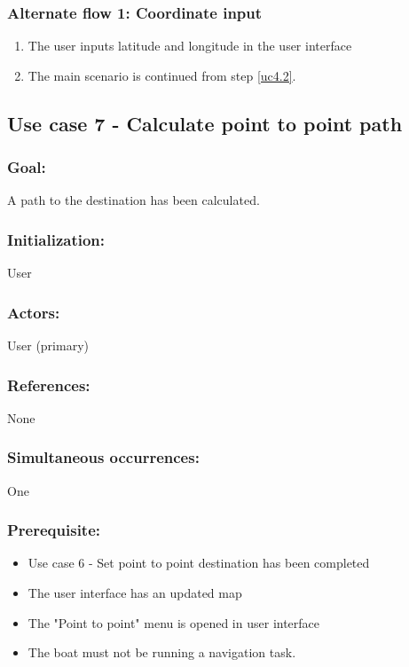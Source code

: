 \begin{framed}
	\subsubsection*{Alternate flow 1: Coordinate input}
		\begin{enumerate}
			\item The user inputs latitude and longitude in the user interface
			\item The main scenario is continued from step \ref{uc4.2}.
		\end{enumerate}
\end{framed}	

\begin{framed}
	\subsection{Use case 7 - Calculate point to point path}
	\subsubsection*{Goal:}
	A path to the destination has been calculated.
	
	\subsubsection*{Initialization:}
	User
	
	\subsubsection*{Actors:}
	User (primary)
	
	\subsubsection*{References:}
	None
	
	\subsubsection*{Simultaneous occurrences:}
	One 
	
	\subsubsection*{Prerequisite:}
	\begin{itemize}
		\item Use case 6 - Set point to point destination has been completed
		\item The user interface has an updated map
		\item The "Point to point" menu is opened in user interface
		\item The boat must not be running a navigation task.
	\end{itemize}
	

\end{framed}
